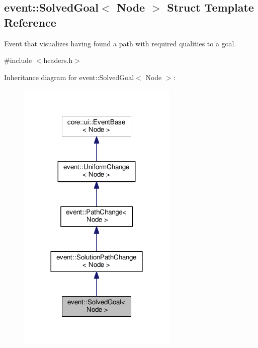\hypertarget{structevent_1_1SolvedGoal}{}\subsection{event\+:\+:Solved\+Goal$<$ Node $>$ Struct Template Reference}
\label{structevent_1_1SolvedGoal}


Event that visualizes having found a path with required qualities to a goal.  




{\ttfamily \#include $<$headers.\+h$>$}



Inheritance diagram for event\+:\+:Solved\+Goal$<$ Node $>$\+:\nopagebreak
\begin{figure}[H]
\begin{center}
\leavevmode
\includegraphics[width=216pt]{structevent_1_1SolvedGoal__inherit__graph}
\end{center}
\end{figure}


